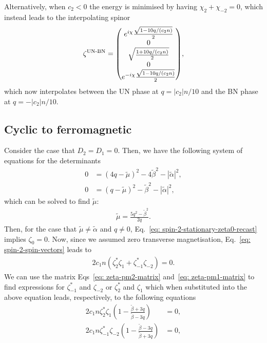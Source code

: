 Alternatively, when \(c_2 < 0\) the energy is minimised by having \(\chi_2
+ \chi_{-2} = 0\), which instead leads to the interpolating spinor
\begin{align}
    \zeta^\text{UN-BN} = \mqty(
        e^{i\chi}\frac{\sqrt{1 - 10q/(c_2n)}}{2} \\
        0 \\
        \sqrt{\frac{1 + 10q/(c_2n)}{2}} \\
        0 \\
        e^{-i\chi}\frac{\sqrt{1 - 10q/(c_2n)}}{2}
    ),
\end{align}
which now interpolates between the UN phase at \(q = |c_2|n/10\) and the BN
phase at \(q = -|c_2|n/10\).

\subsection{Cyclic to ferromagnetic}
Consider the case that \(D_2=D_1=0\).
Then, we have the following system of equations for the determinants
\begin{align}
    0 &= {(4q - \tilde{\mu})}^2 - 4\tilde{\beta}^2-|\tilde{\alpha}|^2, \\
    0 &= {(q - \tilde{\mu})}^2 - \tilde{\beta}^2 - |\tilde{\alpha}|^2,
\end{align}
which can be solved to find \(\tilde{\mu}\):
\begin{align}\label{eq: mu-C-FM}
    \tilde{\mu} = \frac{5q^2-\tilde{\beta}^2}{2q}.
\end{align}
Then, for the case that \(\tilde{\mu} \neq \tilde{\alpha}\) and \(q \neq 0\),
Eq.~\eqref{eq: spin-2-stationary-zeta0-recast} implies \(\zeta_0=0\).
Now, since we assumed zero transverse magnetisation,
Eq.~\eqref{eq: spin-2-spin-vectors} leads to
\begin{align}
    2c_1n(\zeta_2^*\zeta_1 + \zeta_{-1}^*\zeta_{-2}) = 0.
\end{align}
We can use the matrix Eqs~\eqref{eq: zeta-pm2-matrix}
and~\eqref{eq: zeta-pm1-matrix} to find expressions for \(\zeta_{-1}^*\) and
\(\zeta_{-2}\) or \(\zeta_{2}^*\) and \(\zeta_{1}\) which when substituted into
the above equation leads, respectively,
to the following equations
\begin{align}
    2c_1n\zeta_2^*\zeta_1\left(
        1 - \frac{\tilde{\beta} + 3q}{\tilde{\beta} - 3q}
    \right) &= 0, \\
    2c_1n\zeta_{-1}^*\zeta_{-2}\left(
        1 - \frac{\tilde{\beta} - 3q}{\tilde{\beta} + 3q}
    \right) &= 0, 
\end{align}
